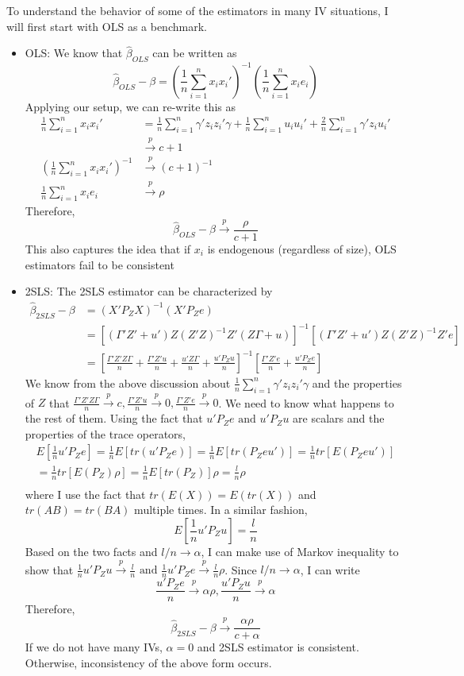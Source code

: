 \documentclass[12pt]{article}
\theoremstyle{definition}
\theoremstyle{property}
\theoremstyle{assumption}
\theoremstyle{example}
\theoremstyle{comment}
\begin{document}
To understand the behavior of some of the estimators in many IV situations, I will first start with OLS as a benchmark.
\begin{itemize}
\item OLS: We know that $\hat{\beta}_{OLS}$ can be written as
\[
\hat{\beta}_{OLS}-\beta=\left(\frac{1}{n}\sum_{i=1}^n x_ix_i'\right)^{-1}\left(\frac{1}{n}\sum_{i=1}^n x_ie_i\right)
\]
Applying our setup, we can re-write this as
\[
\begin{aligned}
\frac{1}{n}\sum_{i=1}^n x_ix_i'&=\frac{1}{n}\sum_{i=1}^n \gamma'z_iz_i'\gamma+\frac{1}{n}\sum_{i=1}^n u_iu_i'+\frac{2}{n}\sum_{i=1}^n \gamma'z_iu_i'\\
&\xrightarrow{p} c+1\\
\left(\frac{1}{n}\sum_{i=1}^n x_ix_i'\right)^{-1}&\xrightarrow{p} (c+1)^{-1}\\
\frac{1}{n}\sum_{i=1}^n x_ie_i&\xrightarrow{p}\rho
\end{aligned}
\]
Therefore, 
\[
\hat{\beta}_{OLS}-\beta\xrightarrow{p}\frac{\rho}{c+1}
\]
This also captures the idea that if $x_i$ is endogenous (regardless of size), OLS estimators fail to be consistent
\item 2SLS: The 2SLS estimator can be characterized by
\[
\begin{aligned}
\hat{\beta}_{2SLS}-\beta&=(X'P_ZX)^{-1}(X'P_Ze)\\
&=[(\Gamma'Z'+u')Z(Z'Z)^{-1}Z'(Z\Gamma+u)]^{-1}[(\Gamma'Z'+u')Z(Z'Z)^{-1}Z'e]\\
&=[\frac{\Gamma'Z'Z\Gamma}{n}+\frac{\Gamma'Z'u}{n}+\frac{u'Z\Gamma}{n}+\frac{u'P_Zu}{n}]^{-1}[\frac{\Gamma'Z'e}{n}+\frac{u'P_Ze}{n}]
\end{aligned}
\]
We know from the above discussion about $\frac{1}{n}\sum_{i=1}^n \gamma'z_iz_i'\gamma$ and the properties of $Z$ that  $\frac{\Gamma'Z'Z\Gamma}{n}\xrightarrow{p}c, \frac{\Gamma'Z'u}{n}\xrightarrow{p}0, \frac{\Gamma'Z'e}{n}\xrightarrow{p}0$. We need to know what happens to the rest of them. Using the fact that $u'P_Ze \text{ and }u'P_Zu$ are scalars and the properties of the trace operators, 
\begin{gather*}
E\left[\frac{1}{n}u'P_Ze\right]=\frac{1}{n}E[tr(u'P_Ze)]=\frac{1}{n}E[tr(P_Zeu')]=\frac{1}{n}tr[E(P_Zeu')]\\
=\frac{1}{n}tr[E(P_Z)\rho]=\frac{1}{n}E[tr(P_Z)]\rho=\frac{l}{n}\rho\\
\end{gather*}
where I use the fact that $tr(E(X))=E(tr(X))$ and $tr(AB)=tr(BA)$ multiple times. In a similar fashion, 
\[
E\left[\frac{1}{n}u'P_Zu\right] = \frac{l}{n}
\]
Based on the two facts and $l/n\to\alpha$, I can make use of Markov inequality to show that $\frac{1}{n}u'P_Zu\xrightarrow{p} \frac{l}{n}\text{ and }\frac{1}{n}u'P_Ze\xrightarrow{p}\frac{l}{n}\rho$. Since $l/n\to\alpha$, I can write
\[
\frac{u'P_Ze}{n}\xrightarrow{p} \alpha\rho, \frac{u'P_Zu}{n}\xrightarrow{p} \alpha
\]
Therefore, 
\[
\hat{\beta}_{2SLS}-\beta\xrightarrow{p}\frac{\alpha\rho}{c+\alpha}
\]
If we do not have many IVs, $\alpha=0$ and 2SLS estimator is consistent. Otherwise, inconsistency of the above form occurs. 
\end{itemize}
\end{document}
